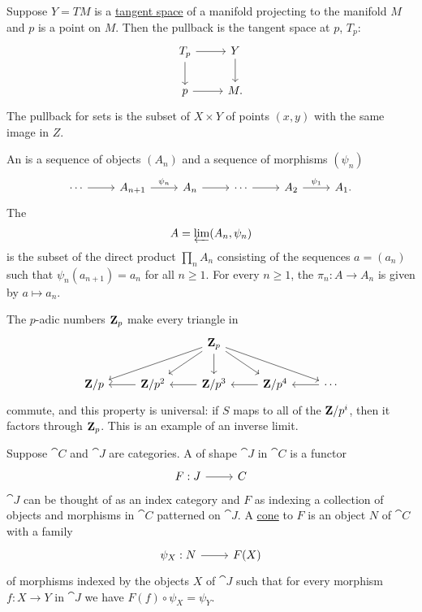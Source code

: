 \documentclass[11pt, twoside]{article}
\begin{document}
Suppose $Y=TM$ is a \href{https://en.wikipedia.org/wiki/Tangent_space}{\color{black}tangent space} of a manifold projecting to the manifold $M$ and $p$ is a point on $M$. Then the pullback is the tangent space at $p$, $T_p$:
\[
\begin{tikzcd}
T_p \arrow[r] \arrow[d]& Y \arrow[d]\\
p\arrow[r]&M.
\end{tikzcd}
\]
The pullback for sets is the subset of $X\times Y$ of points $(x,y)$ with the same image in $Z$.

An  is a sequence of objects $(A_n)$ and a sequence of morphisms $(\psi_n)$ 
\[
\begin{tikzcd}
\cdots \arrow[r]  & A_{n+1}\arrow[r, "\psi_n"] & A_n \arrow[r] &\cdots \arrow[r]  & A_2 \arrow[r, "\psi_1"] & A_1.
\end{tikzcd}
\]
The \href{https://en.wikipedia.org/wiki/Inverse_limit}{} 
\[
A = \varprojlim (A_n, \psi_n)
\]
is the subset of the direct product $\prod_n A_n$ consisting of the sequences $a=(a_n)$ such that $\psi_n(a_{n+1}) = a_n$ for all $n\ge 1$. For every $n\ge 1$, the  $\pi_n : A \longrightarrow A_n$ is given by $a \longmapsto a_n$.

The $p$-adic numbers $\mathbf{Z}_p$ make every triangle in 
\[
\begin{tikzcd}
&&\Z_p \arrow[dll]\arrow[dl] \arrow[d]\arrow[dr] \arrow[drr] &&\\
\Z/p & \Z/p^2 \arrow[l] & \Z/p^3 \arrow[l] & \Z/p^4\arrow[l]  & \cdots \arrow[l]
\end{tikzcd}
\]
commute, and this property is universal: if $S$ maps to all of the $\mathbf{Z}/p^i$, then it factors through $\mathbf{Z}_p$. This is an example of an inverse limit.

Suppose $\cat C$ and $\cat J$ are categories. A \href{https://en.wikipedia.org/wiki/Diagram_(category_theory)}{} of shape $\cat J$ in $\cat C$ is a functor 
\[
\begin{tikzcd}
F:\cat J \ar[r]& \cat C
\end{tikzcd}
\]
$\cat J$ can be thought of as an index category and $F$ as indexing a collection of objects and morphisms in $\cat C$ patterned on $\cat J$. A \href{https://en.wikipedia.org/wiki/Cone_(category_theory)}{\color{black}cone} to $F$ is an object $N$ of $\cat C$ with a family
\[
\begin{tikzcd}
\psi_X : N\ar[r] & F(X)
\end{tikzcd}
\]
of morphisms indexed by the objects $X$ of $\cat J$ such that for every morphism $f:X\longrightarrow Y$ in $\cat J$ we have $F(f) \circ \psi_X = \psi_Y$.
\end{document}
